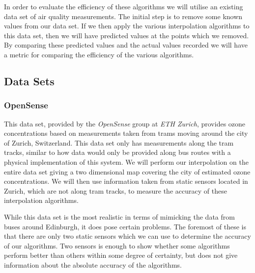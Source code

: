 		In order to evaluate the efficiency of these algorithms we will utilise an existing data set of air quality measurements. The initial step is to remove some known values from our data set. If we then apply the various interpolation algorithms to this data set, then we will have predicted values at the points which we removed. By comparing these predicted values and the actual values recorded we will have a metric for comparing the efficiency of the various algorithms. 

		\subsection{Data Sets}\label{prediction_evaluation_methodology_data_sets}

			\subsubsection{OpenSense}\label{prediction_evaluation_methodology_data_sets_opensense}


				This data set, provided by the \emph{OpenSense} group at \emph{ETH Zurich}, provides ozone concentrations based on measurements taken from trams moving around the city of Zurich, Switzerland. This data set only has measurements along the tram tracks, similar to how data would only be provided along bus routes with a physical implementation of this system. We will perform our interpolation on the entire data set giving a two dimensional map covering the city of estimated ozone concentrations. We will then use information taken from static sensors located in Zurich, which are not along tram tracks, to measure the accuracy of these interpolation algorithms. 


				While this data set is the most realistic in terms of mimicking the data from buses around Edinburgh, it does pose certain problems. The foremost of these is that there are only two static sensors which we can use to determine the accuracy of our algorithms. Two sensors is enough to show whether some algorithms perform better than others within some degree of certainty, but does not give information about the absolute accuracy of the algorithms. 

